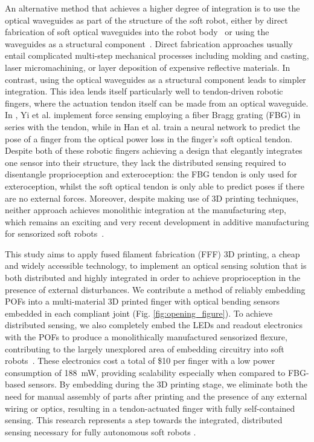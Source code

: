 An alternative method that achieves a higher degree of integration is to use the optical waveguides as part of the structure of the soft robot, either by direct fabrication of soft optical waveguides into the robot body~\cite{Yun2021,Jung2020,DelBono2024} or using the waveguides as a structural component~\cite{optoelectronically_innervated_hand_zhao,Kang2023}. Direct fabrication approaches usually entail complicated multi-step mechanical processes including molding and casting, laser micromachining, or layer deposition of expensive reflective materials. In contrast, using the optical waveguides as a structural component leads to simpler integration. This idea lends itself particularly well to tendon-driven robotic fingers, where the actuation tendon itself can be made from an optical waveguide. In \cite{Yi2023}, Yi et al. implement force sensing employing a fiber Bragg grating (FBG) in series with the tendon, while in \cite{Han2024} Han et al. train a neural network to predict the pose of a finger from the optical power loss in the finger's soft optical tendon. Despite both of these robotic fingers achieving a design that elegantly integrates one sensor into their structure, they lack the distributed sensing required to disentangle proprioception and exteroception: the FBG tendon is only used for exteroception, whilst the soft optical tendon is only able to predict poses if there are no external forces. Moreover, despite making use of 3D printing techniques, neither approach achieves monolithic integration at the manufacturing step, which remains an exciting and very recent development in additive manufacturing for sensorized soft robots~\cite{Lipson2015,Rus2015,Muth2014,Shih2019,Ntagios2020}.

This study aims to apply fused filament fabrication (FFF) 3D printing, a cheap and widely accessible technology, to implement an optical sensing solution that is both distributed and highly integrated in order to achieve proprioception in the presence of external disturbances. We contribute a method of reliably embedding POFs into a multi-material 3D printed finger with optical bending sensors embedded in each compliant joint (Fig. \ref{fig:opening_figure}). To achieve distributed sensing, we also completely embed the LEDs and readout electronics with the POFs to produce a monolithically manufactured sensorized flexure, contributing to the largely unexplored area of embedding circuitry into soft robots~\cite{Woodman2024}. These electronics cost a total of \$10 per finger with a low power consumption of \qty{188}{mW}, providing scalability especially when compared to FBG-based sensors. By embedding during the 3D printing stage, we eliminate both the need for manual assembly of parts after printing and the presence of any external wiring or optics, resulting in a tendon-actuated finger with fully self-contained sensing. This research represents a step towards the integrated, distributed sensing necessary for fully autonomous soft robots \cite{Soter2018,Thuruthel2019,Truby2020}. 


